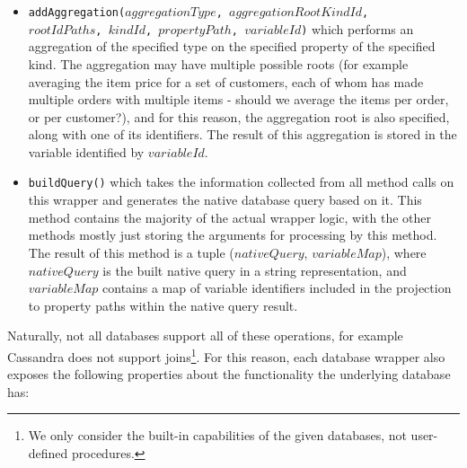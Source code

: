 \begin{itemize}
    \item \texttt{addAggregation($aggregationType$, $aggregationRootKindId$,\\$rootIdPaths$, $kindId$, $propertyPath$, $variableId$)} which performs an aggregation of the specified type on the specified property of the specified kind. The aggregation may have multiple possible roots (for example averaging the item price for a set of customers, each of whom has made multiple orders with multiple items - should we average the items per order, or per customer?), and for this reason, the aggregation root is also specified, along with one of its identifiers. The result of this aggregation is stored in the variable identified by $variableId$.
    \item \texttt{buildQuery()} which takes the information collected from all method calls on this wrapper and generates the native database query based on it. This method contains the majority of the actual wrapper logic, with the other methods mostly just storing the arguments for processing by this method. The result of this method is a tuple ($nativeQuery$, $variableMap$), where $nativeQuery$ is the built native query in a string representation, and $variableMap$ contains a map of variable identifiers included in the projection to property paths within the native query result.
\end{itemize}

Naturally, not all databases support all of these operations, for example Cassandra does not support joins\footnote{We only consider the built-in capabilities of the given databases, not user-defined procedures.}.
For this reason, each database wrapper also exposes the following properties about the functionality the underlying database has:

